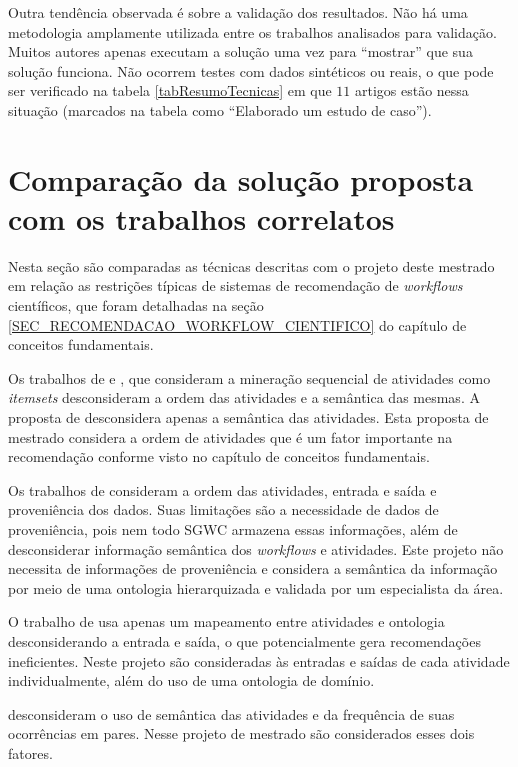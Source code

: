 Outra tendência observada é sobre a validação dos resultados. Não há uma metodologia amplamente utilizada entre os trabalhos analisados para validação. Muitos autores apenas executam a solução uma vez para ``mostrar'' que sua solução funciona. Não ocorrem testes com dados sintéticos ou reais, o que pode ser verificado na tabela \ref{tabResumoTecnicas} em que \(11\) artigos estão nessa situação (marcados na tabela como ``Elaborado um estudo de caso'').

\section{Comparação da solução proposta com os trabalhos correlatos}\label{SEC_COMPARACAO_CORRELATOS}
Nesta seção são comparadas as técnicas descritas com o projeto deste mestrado em relação as restrições típicas de sistemas de recomendação de \emph{workflows} científicos, que foram detalhadas na seção \ref{SEC_RECOMENDACAO_WORKFLOW_CIENTIFICO} do capítulo de conceitos fundamentais.

Os trabalhos de  e , que consideram a mineração sequencial de atividades como \emph{itemsets} desconsideram a ordem das atividades e a semântica das mesmas. A proposta de  desconsidera apenas a semântica das atividades. Esta proposta de mestrado considera a ordem de atividades que é um fator importante na recomendação conforme visto no capítulo de conceitos fundamentais.

Os trabalhos de  consideram a ordem das atividades, entrada e saída e proveniência dos dados. Suas limitações são a necessidade de dados de proveniência, pois nem todo SGWC armazena essas informações, além de desconsiderar informação semântica dos \emph{workflows} e atividades. Este projeto não necessita de informações de proveniência e considera a semântica da informação por meio de uma ontologia hierarquizada e validada por um especialista da área.

O trabalho de  usa apenas um mapeamento entre atividades e ontologia desconsiderando a entrada e saída, o que potencialmente gera recomendações ineficientes. Neste projeto são consideradas às entradas e saídas de cada atividade individualmente, além do uso de uma ontologia de domínio.

 desconsideram o uso de semântica das atividades e da frequência de suas ocorrências em pares. Nesse projeto de mestrado são considerados esses dois fatores.

